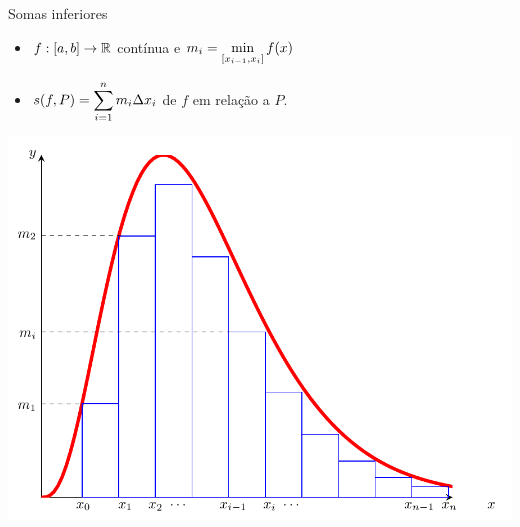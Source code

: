 \begin{frame}[label=def_integral]{Somas inferiores}
	\begin{itemize}
		\item $f:[a,b]\to \mathbb{R}$ contínua e $m_i=\displaystyle\min_{[x_{i-1},x_i]}f(x)$
		
		\item $s(f,P)=\displaystyle\sum_{i=1}^{n}m_i\Delta x_i$  de $f$ em relação a $P$.
	\end{itemize}
	
%

\begin{center}
	\includegraphics[scale=0.3]{som-inf.png}
\end{center}
\end{frame}


